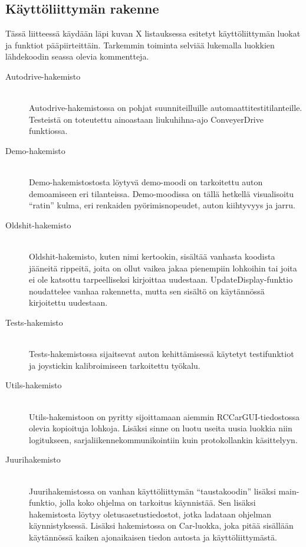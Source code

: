 \documentclass{article}
\begin{document}
\clearpage
\begin{appendices}

\section{Käyttöliittymän rakenne} \label{app:gui}
Tässä liitteessä käydään läpi kuvan X listauksessa esitetyt käyttöliittymän luokat ja funktiot pääpiirteittäin. Tarkemmin toiminta selviää lukemalla luokkien lähdekoodin seassa olevia kommentteja.

\begin{description}
\item[Autodrive-hakemisto] \hfill \\
	Autodrive-hakemistossa on pohjat suunniteilluille automaattitestitilanteille. Testeistä on toteutettu ainoastaan liukuhihna-ajo ConveyerDrive funktiossa.

\item[Demo-hakemisto] \hfill \\
	Demo-hakemistostosta löytyvä demo-moodi on tarkoitettu auton demoamiseen eri tilanteissa. Demo-moodissa on tällä hetkellä visualisoitu ``ratin'' kulma, eri renkaiden pyörimisnopeudet, auton kiihtyvyys ja jarru.

\item[Oldshit-hakemisto] \hfill \\
	Oldshit-hakemisto, kuten nimi kertookin, sisältää vanhasta koodista jääneitä rippeitä, joita on ollut vaikea jakaa pienempiin lohkoihin tai joita ei ole katsottu tarpeelliseksi kirjoittaa uudestaan. UpdateDisplay-funktio noudattelee vanhaa rakennetta, mutta sen sisältö on käytännössä kirjoitettu uudestaan.

\item[Tests-hakemisto] \hfill \\
	Tests-hakemistossa sijaitsevat auton kehittämisessä käytetyt testifunktiot ja joystickin kalibroimiseen tarkoitettu työkalu.

\item[Utils-hakemisto] \hfill \\
	Utils-hakemistoon on pyritty sijoittamaan aiemmin RCCarGUI-tiedostossa olevia kopioituja lohkoja. Lisäksi sinne on luotu useita uusia luokkia niin logitukseen, sarjaliikennekommunikointiin kuin protokollankin käsittelyyn.

\item[Juurihakemisto] \hfill \\
	Juurihakemistossa on vanhan käyttöliittymän ``taustakoodin'' lisäksi main-funktio, jolla koko ohjelma on tarkoitus käynnistää. Sen lisäksi hakemistosta löytyy oletusasetustiedostot, jotka ladataan ohjelman käynnistyksessä. Lisäksi hakemistossa on Car-luokka, joka pitää sisällään käytännössä kaiken ajonaikaisen tiedon autosta ja käyttöliittymästä.
\end{description}


\end{appendices}
\end{document}
